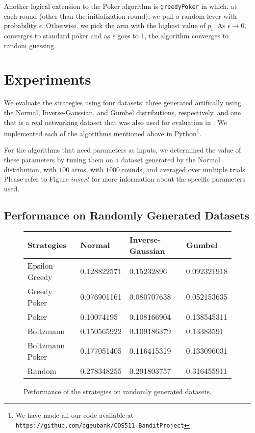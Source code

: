 \documentclass[12pt]{article}
\begin{document}
Another logical extension to the Poker algorithm is \texttt{greedyPoker} in which, at each round (other than the initialization round), we pull a random lever with probability $\epsilon$. Otherwise, we pick the arm with the highest value of $p_{i}$. As $\epsilon \to 0$,  converges to standard poker and as $\epsilon$ goes to 1, the algorithm converges to random guessing.

\section{Experiments}

We evaluate the strategies using four datasets: three generated artifically using the Normal, Inverse-Gaussian, and Gumbel distributions, respectively,
and one that is a real networking dataset that was also used for evaluation in \cite{Mohri}. 
We implemented each of the algorithms mentioned above in Python\footnote{We have made all our code available at \texttt{https://github.com/cgeubank/COS511-BanditProject}}. 

For the algorithms that need parameters as inputs, we determined the value of these parameters by tuning them on a dataset generated by the Normal distribution, with $100$ arms,
with $1000$ rounds, and averaged over multiple trials.  Please refer to Figure $insert$ for more information about the specific parameters used.

\subsection{Performance on Randomly Generated Datasets}

\begin{figure}
\begin{center}
    \begin{tabular}{| l | l | l | l |}
    \hline
    Strategies & Normal & Inverse-Gaussian & Gumbel \\ \hline
    Epsilon-Greedy & 0.128822571 & 0.15232896 & 0.092321918 \\ \hline
    Greedy Poker & 0.076901161 & 0.080707638 & 0.052153635 \\ \hline
    Poker & 0.10074195 & 0.108166904 & 0.138545311 \\ \hline
    Boltzmann & 0.150565922 & 0.109186379 & 0.13383591 \\ \hline
    Boltzmann Poker & 0.177051405 & 0.116415319 & 0.133096031 \\ \hline 
    Random & 0.278348255 & 0.291803757 & 0.316455911 \\ \hline
    \hline
    \end{tabular}
\end{center}  
\caption{Performance of the strategies on randomly generated datasets.}
\end{figure}
\end{document}
